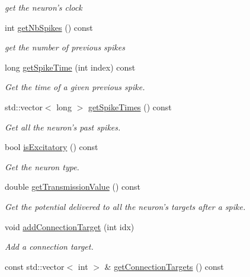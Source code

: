 \begin{DoxyCompactItemize}
\begin{DoxyCompactList}\small\item\em get the neuron's clock \end{DoxyCompactList}\item 
\hypertarget{classNeuron_ab1efa405eb0cd7bac6ca012c961efe5d}{int \hyperlink{classNeuron_ab1efa405eb0cd7bac6ca012c961efe5d}{get\-Nb\-Spikes} () const }\label{classNeuron_ab1efa405eb0cd7bac6ca012c961efe5d}

\begin{DoxyCompactList}\small\item\em get the number of previous spikes \end{DoxyCompactList}\item 
long \hyperlink{classNeuron_a3e384609e8e1e73202abdd10ec79ef2e}{get\-Spike\-Time} (int index) const 
\begin{DoxyCompactList}\small\item\em Get the time of a given previous spike. \end{DoxyCompactList}\item 
std\-::vector$<$ long $>$ \hyperlink{classNeuron_af0e376951d666bfd4c860b25863d28b4}{get\-Spike\-Times} () const 
\begin{DoxyCompactList}\small\item\em Get all the neuron's past spikes. \end{DoxyCompactList}\item 
bool \hyperlink{classNeuron_a65f5868f9a2ddc2414a5880f28b76d4c}{is\-Excitatory} () const 
\begin{DoxyCompactList}\small\item\em Get the neuron type. \end{DoxyCompactList}\item 
double \hyperlink{classNeuron_a177c8f1881dd4ae47e505d8040e990c8}{get\-Transmission\-Value} () const 
\begin{DoxyCompactList}\small\item\em Get the potential delivered to all the neuron's targets after a spike. \end{DoxyCompactList}\item 
void \hyperlink{classNeuron_a359701815e8c72b460d2959a339c4b54}{add\-Connection\-Target} (int idx)
\begin{DoxyCompactList}\small\item\em Add a connection target. \end{DoxyCompactList}\item 
const std\-::vector$<$ int $>$ \& \hyperlink{classNeuron_ac2730f0eb7d821f2d49d4ab017f5a6d9}{get\-Connection\-Targets} () const 

\end{DoxyCompactItemize}
